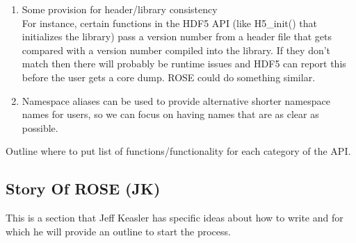 \begin{enumerate}
   \item Some provision for header/library consistency \\
	For instance, certain functions in the HDF5 API (like H5\_init()
	that initializes the library) pass a version number from a
	header file that gets compared with a version number compiled
	into the library. If they don't match then there will probably
	be runtime issues and HDF5 can report this before the user
	gets a core dump.  ROSE could do something similar.

   \item Namespace aliases can be used to provide alternative shorter
   namespace names for users, so we can focus on having names that are
   as clear as possible.
\end{enumerate}

Outline where to put list of functions/functionality for each category of the API.

\subsection{Story Of ROSE (JK)}
   This is a section that Jeff Keasler has specific ideas about how to write and
for which he will provide an outline to start the process.

